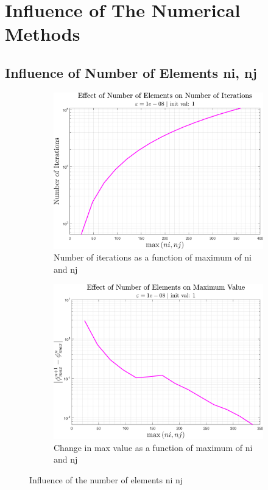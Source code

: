 \documentclass[11pt, a4paper]{article}
\begin{document}
\section{Influence of The Numerical Methods}
\subsection{Influence of Number of Elements ni, nj}
\begin{figure}[H]
    \centering
    \begin{subfigure}[c]{0.49\textwidth}
        \centering
        \includegraphics[width=\textwidth]{images/ni nj - n.png}
        \caption{Number of iterations as a function of maximum of ni and nj}
        \label{fig: n as a function of max ni nj}
    \end{subfigure}
    \hfill
    \begin{subfigure}[c]{0.49\textwidth}
        \centering
        \includegraphics[width=\textwidth]{images/ni nj - max diff.png}
        \caption{Change in max value as a function of maximum of ni and nj}
        \label{fig: change in max value as a function of max ni nj}
    \end{subfigure}
    \caption{Influence of the number of elements ni nj}
    \label{fig: Influence of ni nj}
\end{figure}
\end{document}
